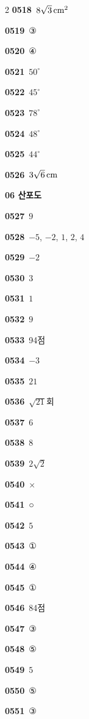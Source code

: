\documentclass[10pt,a4paper]{article}
\begin{document}
\begin{multicols}{2}
\noindent\textbf{0518}\ $8\sqrt{3}\mkern3mu \mathrm{cm}^2$\par
\noindent\textbf{0519}\ ③\par
\noindent\textbf{0520}\ ④\par
\noindent\textbf{0521}\ $50^\circ$\par
\noindent\textbf{0522}\ $45^\circ$\par
\noindent\textbf{0523}\ $78^\circ$\par
\noindent\textbf{0524}\ $48^\circ$\par
\noindent\textbf{0525}\ $44^\circ$\par
\noindent\textbf{0526}\ $3\sqrt{6}\mkern3mu \mathrm{cm}$\par
\noindent\textbf{06 산포도}\par\smallskip
\noindent\textbf{0527}\ $9$\par
\noindent\textbf{0528}\ $-5$, $-2$, $1$, $2$, $4$\par
\noindent\textbf{0529}\ $-2$\par
\noindent\textbf{0530}\ $3$\par
\noindent\textbf{0531}\ $1$\par
\noindent\textbf{0532}\ $9$\par
\noindent\textbf{0533}\ 94점\par
\noindent\textbf{0534}\ $-3$\par
\noindent\textbf{0535}\ $21$\par
\noindent\textbf{0536}\ $\sqrt{21}$회\par
\noindent\textbf{0537}\ $6$\par
\noindent\textbf{0538}\ $8$\par
\noindent\textbf{0539}\ $2\sqrt{2}$\par
\noindent\textbf{0540}\ ×\par
\noindent\textbf{0541}\ ○\par
\noindent\textbf{0542}\ $5$\par
\noindent\textbf{0543}\ ①\par
\noindent\textbf{0544}\ ④\par
\noindent\textbf{0545}\ ①\par
\noindent\textbf{0546}\ 84점\par
\noindent\textbf{0547}\ ③\par
\noindent\textbf{0548}\ ⑤\par
\noindent\textbf{0549}\ $5$\par
\noindent\textbf{0550}\ ⑤\par
\noindent\textbf{0551}\ ③\par

\end{multicols}
\end{document}
